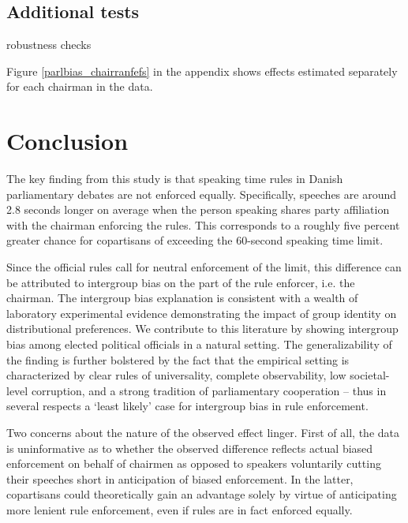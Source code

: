 \documentclass[12pt,a4paper]{article}
\begin{document}
\subsection{Additional tests}


robustness checks

Figure \ref{parlbias_chairranfefs} in the appendix shows effects estimated separately for each chairman in the data.


\section{Conclusion}\label{conc}

\noindent The key finding from this study is that speaking time rules in Danish parliamentary debates are not enforced equally. Specifically, speeches are around 2.8 seconds longer on average when the person speaking shares party affiliation with the chairman enforcing the rules. This corresponds to a roughly five percent greater chance for copartisans of exceeding the 60-second speaking time limit.

Since the official rules call for neutral enforcement of the limit, this difference can be attributed to intergroup bias on the part of the rule enforcer, i.e. the chairman. The intergroup bias explanation is consistent with a wealth of laboratory experimental evidence demonstrating the impact of group identity on distributional preferences. We contribute to this literature by showing intergroup bias among elected political officials in a natural setting. The generalizability of the finding is further bolstered by the fact that the empirical setting is characterized by clear rules of universality, complete observability, low societal-level corruption, and a strong tradition of parliamentary cooperation -- thus in several respects a `least likely' case for intergroup bias in rule enforcement.


Two concerns about the nature of the observed effect linger. First of all, the data is uninformative as to whether the observed difference reflects actual biased enforcement on behalf of chairmen as opposed to speakers voluntarily cutting their speeches short in anticipation of biased enforcement. In the latter, copartisans could theoretically gain an advantage solely by virtue of anticipating more lenient rule enforcement, even if rules are in fact enforced equally. 
\end{document}

